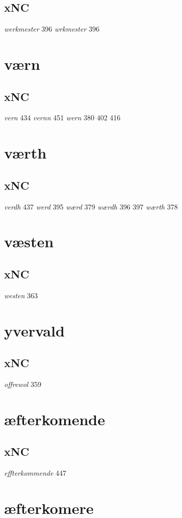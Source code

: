 \documentclass[a4paper,twocolumn]{article}
\begin{document}
\subsection{xNC}
\label{sec:org0301269}
\emph{werkmester} 396 \emph{wrkmester} 396 
\section{værn}
\label{sec:orgad0751b}
\subsection{xNC}
\label{sec:org2f26a72}
\emph{vern} 434 \emph{vernn} 451 \emph{wern} 380 402 416 
\section{værth}
\label{sec:org37cb26c}
\subsection{xNC}
\label{sec:orgb98464b}
\emph{verdh} 437 \emph{werd} 395 \emph{wærd} 379 \emph{wærdh} 396 397 \emph{wærth} 378 
\section{væsten}
\label{sec:orgf3bebcf}
\subsection{xNC}
\label{sec:orge7a9a29}
\emph{westen} 363 
\section{yvervald}
\label{sec:org1d3ab5e}
\subsection{xNC}
\label{sec:orgff950ff}
\emph{offrewol} 359 
\section{æfterkomende}
\label{sec:orgdb18097}
\subsection{xNC}
\label{sec:orga858adc}
\emph{effterkommende} 447 
\section{æfterkomere}
\label{sec:org1c26d93}
\end{document}
